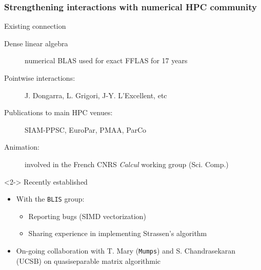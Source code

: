 \documentclass{beamer}
\begin{document}
\begin{frame}
  \frametitle{Strengthening interactions with numerical HPC community}
  \begin{block}  {Existing connection}
    \begin{description}
    \item[Dense linear algebra] numerical BLAS used for exact FFLAS for 17 years
    \item[Pointwise interactions:] J. Dongarra, L. Grigori, J-Y. L'Excellent,  etc
    \item[Publications to main HPC venues:]
      SIAM-PPSC, EuroPar, PMAA, ParCo
    \item[Animation:] involved in the French CNRS \textit{Calcul}  working group (Sci. Comp.)
    \end{description}
  \end{block}
  \begin{block}<2->  {Recently established}
    \begin{itemize}
    \item With the \texttt{BLIS} group:
      \begin{itemize}
      \item Reporting bugs (SIMD vectorization)
      \item Sharing experience in implementing Strassen's algorithm
      \end{itemize}
    \item On-going collaboration with T. Mary (\texttt{Mumps}) and
        S. Chandrasekaran (UCSB) on quasiseparable matrix algorithmic
    \end{itemize}
  \end{block}
\end{frame}

\end{document}
